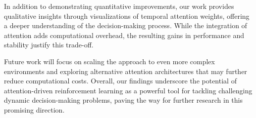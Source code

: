 \documentclass{article}
\begin{document}
In addition to demonstrating quantitative improvements, our work provides qualitative insights through visualizations of temporal attention weights, offering a deeper understanding of the decision-making process. While the integration of attention adds computational overhead, the resulting gains in performance and stability justify this trade-off. 

Future work will focus on scaling the approach to even more complex environments and exploring alternative attention architectures that may further reduce computational costs. Overall, our findings underscore the potential of attention-driven reinforcement learning as a powerful tool for tackling challenging dynamic decision-making problems, paving the way for further research in this promising direction.




\end{document}
